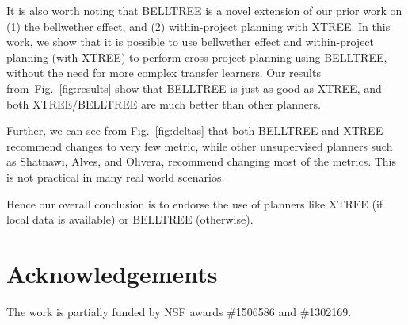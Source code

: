 \documentclass[smallextended]{svjour3}       %
\newcommand{\be}{\begin{enumerate}}
\newcommand{\ee}{\end{enumerate}}
\newcommand{\fig}[1]{Fig.~\ref{fig:#1}}
\begin{document}
It is also worth noting that BELLTREE is a novel extension of our prior work on (1) the bellwether effect, and (2) within-project planning with XTREE. In this work, we show that it is possible to use bellwether effect and within-project planning (with XTREE) to perform cross-project planning using BELLTREE, without the need for more complex transfer learners. Our results from~\fig{results} show that BELLTREE is just as good as XTREE, and both XTREE/BELLTREE are much better than other planners. 

Further, we can see from \fig{deltas} that both BELLTREE and XTREE recommend changes to very few metric, while other unsupervised planners such as Shatnawi, Alves, and Olivera, recommend changing most of the metrics. This is not practical in many real world scenarios.


Hence our overall conclusion is to endorse the use of planners like XTREE (if local data is available) or BELLTREE (otherwise).




\section*{Acknowledgements}
The work is partially funded by NSF awards \#1506586 and \#1302169.

% 

\end{document}
